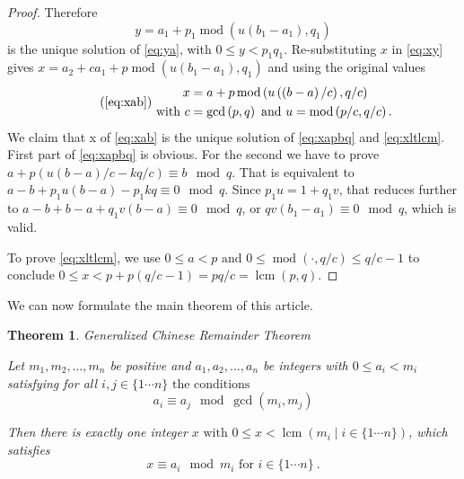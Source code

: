 \documentclass[12pt]{article}
\newtheorem{theorem}{Theorem}
\def\1ton{1 \cdots n}
\def\lt{<}
\DeclareMathOperator*{\modf}{mod}
\DeclareMathOperator{\lcm}{lcm}
\begin{document}
\begin{proof}
	 Therefore
	 \begin{equation*}
	   	y = a_1 + p_1 \modf\left(u \left(b_1 - a_1\right), q_1\right)
	 \end{equation*}
	 is the unique solution of \eqref{eq:ya}, with $0 \le y \lt p_1 q_1$. Re-substituting $x$ in \eqref{eq:xy} gives $x = a_2 + c a_1 + p \modf\left(u \left(b_1 - a_1\right), q_1\right)$ and using the original values
	 \begin{equation}
	 \tag{\ref{eq:xab}}
	 \begin{split}
		 x &= a + p \modf\left( u \left(\left(b - a\right) / c\right), q/c \right)\\
		\text{ with } c &= \gcd\left(p, q\right) \text{ and } u = \modf\left(p/c, q/c\right).\notag
		\end{split}
	 \end{equation}
	 We claim that x of \eqref{eq:xab} is the unique solution of \eqref{eq:xapbq} and \eqref{eq:xltlcm}. First part of \eqref{eq:xapbq} is obvious. For the second we have to prove $a + p \left(u \left(b - a\right)/c - k q / c\right) \equiv b \mod q$. That is equivalent to $a - b + p_1 u \left(b - a\right) - p_1 k q \equiv 0 \mod q$. Since $p_1 u = 1 + q_1 v$,  that reduces further to
	 $a - b + b - a + q_1 v \left(b - a\right) \equiv 0 \mod q$, or $q v \left(b_1 - a_1\right) \equiv 0 \mod q$, which is valid.
	 
	 To prove \eqref{eq:xltlcm}, we use $0 \le a \lt p \text{ and } 0 \le \modf\left(\cdot, q/c\right) \le q/c - 1$ to conclude $0 \le x \lt p + p\left(q/c-1\right) = p q / c = \lcm\left(p, q\right)$.

\end{proof}

We can now formulate the main theorem of this article.
\begin{theorem}{Generalized Chinese Remainder Theorem}
	\label{theorem:CRTG}
	
	Let $m_1, m_2, \dotsc , m_n$ be positive and $a_1, a_2, \dotsc , a_n$ be integers with $0 \le a_i \lt m_i$ satisfying for all $i, j \in \{\1ton\} \text{ the conditions }$ $$a_i \equiv a_j \mod \gcd\left(m_i, m_j\right)$$

	Then there is exactly one integer $x \text{ with } 0 \le x \lt \lcm\left(m_i \mid i \in \{\1ton\} \right)$, which satisfies
	 $$x \equiv a_i \mod m_i \text{ for } i \in \{\1ton\} \ .$$
		
\end{theorem}
\end{document}
